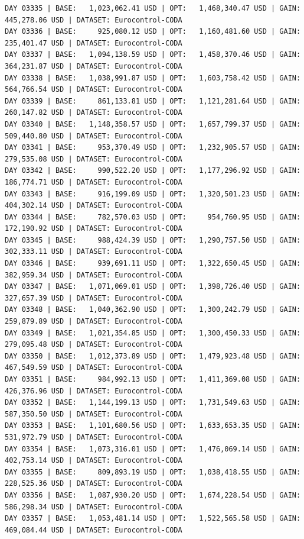 \documentclass[11pt,a4paper]{article}
\begin{document}
\begin{verbatim}
DAY 03335 | BASE:   1,023,062.41 USD | OPT:   1,468,340.47 USD | GAIN: 445,278.06 USD | DATASET: Eurocontrol-CODA
DAY 03336 | BASE:     925,080.12 USD | OPT:   1,160,481.60 USD | GAIN: 235,401.47 USD | DATASET: Eurocontrol-CODA
DAY 03337 | BASE:   1,094,138.59 USD | OPT:   1,458,370.46 USD | GAIN: 364,231.87 USD | DATASET: Eurocontrol-CODA
DAY 03338 | BASE:   1,038,991.87 USD | OPT:   1,603,758.42 USD | GAIN: 564,766.54 USD | DATASET: Eurocontrol-CODA
DAY 03339 | BASE:     861,133.81 USD | OPT:   1,121,281.64 USD | GAIN: 260,147.82 USD | DATASET: Eurocontrol-CODA
DAY 03340 | BASE:   1,148,358.57 USD | OPT:   1,657,799.37 USD | GAIN: 509,440.80 USD | DATASET: Eurocontrol-CODA
DAY 03341 | BASE:     953,370.49 USD | OPT:   1,232,905.57 USD | GAIN: 279,535.08 USD | DATASET: Eurocontrol-CODA
DAY 03342 | BASE:     990,522.20 USD | OPT:   1,177,296.92 USD | GAIN: 186,774.71 USD | DATASET: Eurocontrol-CODA
DAY 03343 | BASE:     916,199.09 USD | OPT:   1,320,501.23 USD | GAIN: 404,302.14 USD | DATASET: Eurocontrol-CODA
DAY 03344 | BASE:     782,570.03 USD | OPT:     954,760.95 USD | GAIN: 172,190.92 USD | DATASET: Eurocontrol-CODA
DAY 03345 | BASE:     988,424.39 USD | OPT:   1,290,757.50 USD | GAIN: 302,333.11 USD | DATASET: Eurocontrol-CODA
DAY 03346 | BASE:     939,691.11 USD | OPT:   1,322,650.45 USD | GAIN: 382,959.34 USD | DATASET: Eurocontrol-CODA
DAY 03347 | BASE:   1,071,069.01 USD | OPT:   1,398,726.40 USD | GAIN: 327,657.39 USD | DATASET: Eurocontrol-CODA
DAY 03348 | BASE:   1,040,362.90 USD | OPT:   1,300,242.79 USD | GAIN: 259,879.89 USD | DATASET: Eurocontrol-CODA
DAY 03349 | BASE:   1,021,354.85 USD | OPT:   1,300,450.33 USD | GAIN: 279,095.48 USD | DATASET: Eurocontrol-CODA
DAY 03350 | BASE:   1,012,373.89 USD | OPT:   1,479,923.48 USD | GAIN: 467,549.59 USD | DATASET: Eurocontrol-CODA
DAY 03351 | BASE:     984,992.13 USD | OPT:   1,411,369.08 USD | GAIN: 426,376.96 USD | DATASET: Eurocontrol-CODA
DAY 03352 | BASE:   1,144,199.13 USD | OPT:   1,731,549.63 USD | GAIN: 587,350.50 USD | DATASET: Eurocontrol-CODA
DAY 03353 | BASE:   1,101,680.56 USD | OPT:   1,633,653.35 USD | GAIN: 531,972.79 USD | DATASET: Eurocontrol-CODA
DAY 03354 | BASE:   1,073,316.01 USD | OPT:   1,476,069.14 USD | GAIN: 402,753.14 USD | DATASET: Eurocontrol-CODA
DAY 03355 | BASE:     809,893.19 USD | OPT:   1,038,418.55 USD | GAIN: 228,525.36 USD | DATASET: Eurocontrol-CODA
DAY 03356 | BASE:   1,087,930.20 USD | OPT:   1,674,228.54 USD | GAIN: 586,298.34 USD | DATASET: Eurocontrol-CODA
DAY 03357 | BASE:   1,053,481.14 USD | OPT:   1,522,565.58 USD | GAIN: 469,084.44 USD | DATASET: Eurocontrol-CODA

\end{verbatim}
\end{document}
